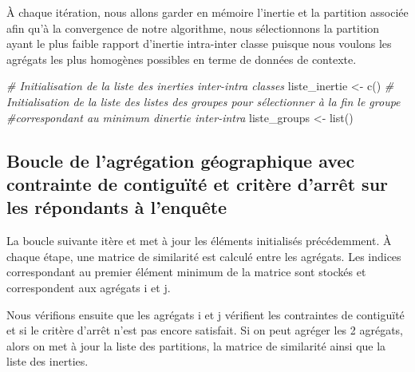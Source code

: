 \documentclass[
]{article}
\newenvironment{Shaded}{\begin{snugshade}}{\end{snugshade}}
\newcommand{\CommentTok}[1]{\textcolor[rgb]{0.56,0.35,0.01}{\textit{#1}}}
\newcommand{\FunctionTok}[1]{\textcolor[rgb]{0.00,0.00,0.00}{#1}}
\newcommand{\NormalTok}[1]{#1}
\newcommand{\OtherTok}[1]{\textcolor[rgb]{0.56,0.35,0.01}{#1}}
\begin{document}
À chaque itération, nous allons garder en mémoire l'inertie et la
partition associée afin qu'à la convergence de notre algorithme, nous
sélectionnons la partition ayant le plus faible rapport d'inertie
intra-inter classe puisque nous voulons les agrégats les plus homogènes
possibles en terme de données de contexte.

\begin{Shaded}
\begin{Highlighting}[]
\CommentTok{\# Initialisation de la liste des inerties inter{-}intra classes}
\NormalTok{liste\_inertie }\OtherTok{\textless{}{-}} \FunctionTok{c}\NormalTok{()}
\CommentTok{\# Initialisation de la liste des listes des groupes pour sélectionner à la fin le groupe}
\CommentTok{\#correspondant au minimum d\textquotesingle{}inertie inter{-}intra}
\NormalTok{liste\_groups }\OtherTok{\textless{}{-}} \FunctionTok{list}\NormalTok{()}
\end{Highlighting}
\end{Shaded}

\hypertarget{boucle-de-lagruxe9gation-guxe9ographique-avec-contrainte-de-contiguuxeftuxe9-et-crituxe8re-darruxeat-sur-les-ruxe9pondants-uxe0-lenquuxeate}{%
\subsection{Boucle de l'agrégation géographique avec contrainte de
contiguïté et critère d'arrêt sur les répondants à
l'enquête}\label{boucle-de-lagruxe9gation-guxe9ographique-avec-contrainte-de-contiguuxeftuxe9-et-crituxe8re-darruxeat-sur-les-ruxe9pondants-uxe0-lenquuxeate}}

La boucle suivante itère et met à jour les éléments initialisés
précédemment. À chaque étape, une matrice de similarité est calculé
entre les agrégats. Les indices correspondant au premier élément minimum
de la matrice sont stockés et correspondent aux agrégats i et j.

Nous vérifions ensuite que les agrégats i et j vérifient les contraintes
de contiguïté et si le critère d'arrêt n'est pas encore satisfait. Si on
peut agréger les 2 agrégats, alors on met à jour la liste des
partitions, la matrice de similarité ainsi que la liste des inerties.
\end{document}
